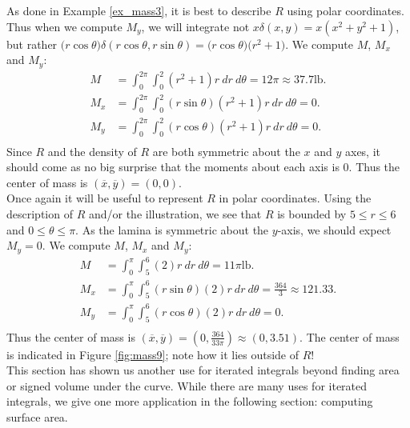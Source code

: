 {As done in Example \ref{ex_mass3}, it is best to describe $R$ using polar coordinates.
Thus when we compute $M_y$, we will integrate not $x\delta(x,y) = x(x^2+y^2+1)$, but rather $\big(r\cos\theta\big)\delta(r\cos\theta,r\sin\theta) = \big(r\cos\theta\big)\big(r^2+1\big).$ We compute $M$, $M_x$ and $M_y$:
\begin{align*}
M &= \int_0^{2\pi}\int_0^2 (r^2+1)r\ dr\ d\theta = 12\pi\approx 37.7\text{lb}.\\
M_x &= \int_0^{2\pi}\int_0^2 (r\sin\theta)(r^2+1)r \ dr\ d\theta = 0.\\
M_y &= \int_0^{2\pi}\int_0^2 (r\cos\theta)(r^2+1)r \ dr\ d\theta = 0.\\
\end{align*}
Since $R$ and the density of $R$ are both symmetric about the $x$ and $y$ axes, it should come as no big surprise that the moments about each axis is 0. Thus the center of mass is $(\overline{x},\overline{y})=(0,0)$. 
}\\

{Once again it will be useful to represent $R$ in polar coordinates. Using the description of $R$ and/or the illustration, we see that $R$ is bounded by $5\leq r\leq 6$ and $0\leq\theta\leq\pi$. As the lamina is symmetric about the $y$-axis, we should expect $M_y=0$. We compute $M$, $M_x$ and $M_y$:
\begin{align*}
M &= \int_0^{\pi}\int_5^6 (2)r\ dr\ d\theta = 11\pi\text{lb}.\\
M_x &= \int_0^{\pi}\int_5^6 (r\sin\theta)(2)r\ dr\ d\theta = \frac{364}3\approx 121.33 .\\
M_y &= \int_0^{\pi}\int_5^6 (r\cos\theta)(2)r\ dr\ d\theta = 0.\\
\end{align*}
Thus the center of mass is $(\overline{x},\overline{y}) = \left(0,\frac{364}{33\pi}\right) \approx (0,3.51).$ The center of mass is indicated in Figure \ref{fig:mass9}; note how it lies outside of $R$!
}\\

This section has shown us another use for iterated integrals beyond finding area or signed volume under the curve. While there are many uses for iterated integrals, we give one more application in the following section: computing surface area.

